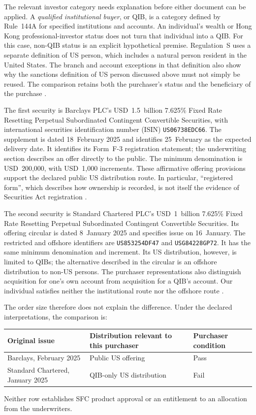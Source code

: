 The relevant investor category needs explanation before either document can be
applied. A \emph{qualified institutional buyer}, or QIB, is a category defined
by Rule~144A for specified institutions and accounts. An individual's wealth
or Hong Kong professional-investor status does not turn that individual into
a QIB. For this case, non-QIB status is an explicit hypothetical premise.
Regulation~S uses a separate definition of US person, which includes a natural
person resident in the United States. The branch and account exceptions in that
definition also show why the sanctions definition of US person discussed above
must not simply be reused. The comparison retains both the purchaser's status
and the beneficiary of the purchase
\citep[Rule~144A(a)(1); Regulation~S, section~230.902(k)]{rule144acoco2025,regsdefinitions2025}.

The first security is Barclays PLC's USD~1.5~billion 7.625\% Fixed Rate Resetting
Perpetual Subordinated Contingent Convertible Securities, with international
securities identification number (ISIN)
\texttt{US06738EDC66}. The supplement is dated 18~February 2025 and identifies
25~February as the expected delivery date. It identifies its Form~F-3
registration statement; the underwriting section describes an offer directly
to the public. The minimum denomination is USD~200,000, with USD~1,000 increments.
These affirmative offering provisions support the declared public US
distribution route. In particular, ``registered form'', which describes how
ownership is recorded, is not itself the evidence of Securities Act registration
\citep[cover; pp.~S-6, S-22 and S-99]{barclayscoco2025}.

The second security is Standard Chartered PLC's USD~1~billion 7.625\% Fixed Rate
Resetting Perpetual Subordinated Contingent Convertible Securities. Its offering
circular is dated 8~January 2025 and specifies issue on 16~January. The restricted
and offshore identifiers are \texttt{US853254DF47} and \texttt{USG84228GP72}.
It has the same minimum denomination and increment. Its US distribution,
however, is limited to QIBs; the alternative described in the circular is an
offshore distribution to non-US persons. The purchaser representations also
distinguish acquisition for one's own account from acquisition for a QIB's
account. Our individual satisfies neither the institutional route nor the
offshore route \citep[pp.~i, 14--15, 140 and 148--149]{standardcharteredcoco2025}.

The order size therefore does not explain the difference. Under the declared
interpretations, the comparison is:
\begin{center}
\begin{tabularx}{\linewidth}{@{}lXl@{}}
\toprule
Original issue & Distribution relevant to this purchaser & Purchaser condition \\
\midrule
Barclays, February 2025 & Public US offering & Pass \\
Standard Chartered, January 2025 & QIB-only US distribution & Fail \\
\bottomrule
\end{tabularx}
\end{center}
Neither row establishes SFC product approval or an entitlement to an allocation
from the underwriters.

